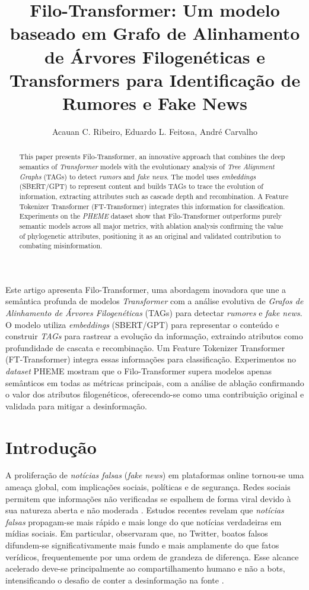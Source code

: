 \documentclass[12pt]{article}
\title{Filo-Transformer: Um modelo baseado em Grafo de Alinhamento de Árvores Filogenéticas e Transformers para Identificação de Rumores e Fake News}
\author{Acauan C. Ribeiro\inst{1,2}, Eduardo L. Feitosa\inst{1}, André Carvalho\inst{1}}
\begin{document}
\maketitle

\begin{abstract}
This paper presents Filo-Transformer, an innovative approach that combines the deep semantics of \textit{Transformer} models with the evolutionary analysis of \textit{Tree Alignment Graphs} (TAGs) to detect \textit{rumors} and \textit{fake news}. The model uses \textit{embeddings} (SBERT/GPT) to represent content and builds TAGs to trace the evolution of information, extracting attributes such as cascade depth and recombination. A Feature Tokenizer Transformer (FT-Transformer) integrates this information for classification. Experiments on the \textit{PHEME} dataset show that Filo-Transformer outperforms purely semantic models across all major metrics, with ablation analysis confirming the value of phylogenetic attributes, positioning it as an original and validated contribution to combating misinformation.
\end{abstract}

\begin{resumo}
Este artigo apresenta Filo-Transformer, uma abordagem inovadora que une a semântica profunda de modelos \textit{Transformer} com a análise evolutiva de \textit{Grafos de Alinhamento de Árvores Filogenéticas} (TAGs) para detectar \textit{rumores} e \textit{fake news}. O modelo utiliza \textit{embeddings} (SBERT/GPT) para representar o conteúdo e construir \textit{TAGs} para rastrear a evolução da informação, extraindo atributos como profundidade de cascata e recombinação. Um Feature Tokenizer Transformer (FT-Transformer) integra essas informações para classificação. Experimentos no \textit{dataset} PHEME mostram que o Filo-Transformer supera modelos apenas semânticos em todas as métricas principais, com a análise de ablação confirmando o valor dos atributos filogenéticos, oferecendo-se como uma contribuição original e validada para mitigar a desinformação.
\end{resumo}

\section{Introdução} \label{sec:introducao}
A proliferação de \textit{notícias falsas} (\textit{fake news}) em plataformas online tornou-se uma ameaça global, com implicações sociais, políticas e de segurança. Redes sociais permitem que informações não verificadas se espalhem de forma viral devido à sua natureza aberta e não moderada \cite{Zubiaga2016}. Estudos recentes revelam que \textit{notícias falsas} propagam-se mais rápido e mais longe do que notícias verdadeiras em mídias sociais. Em particular, \cite{Vosoughi2018} observaram que, no Twitter, boatos falsos difundem-se significativamente mais fundo e mais amplamente do que fatos verídicos, frequentemente por uma ordem de grandeza de diferença. Esse alcance acelerado deve-se principalmente ao compartilhamento humano e não a bots, intensificando o desafio de conter a desinformação na fonte \cite{Vosoughi2018}.
\end{document}
